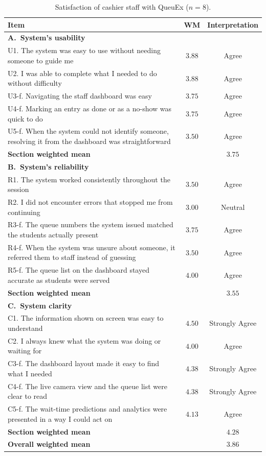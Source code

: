 \documentclass{research}
\newcommand{\sysname}{QueuEx}
\begin{document}
\begin{table}[!htbp]
\centering
\caption{Satisfaction of cashier staff with \sysname{} ($n = 8$).}
\label{tab:sop4-staff}
\begin{tabular}{p{}cc}
\hline
Item & WM & Interpretation \\
\hline
\multicolumn{3}{l}{\textbf{A.\ System's usability}} \\
U1. The system was easy to use without needing someone to guide me
  & $3.88$ & Agree \\
U2. I was able to complete what I needed to do without difficulty
  & $3.88$ & Agree \\
U3-f. Navigating the staff dashboard was easy
  & $3.75$ & Agree \\
U4-f. Marking an entry as done or as a no-show was quick to do
  & $3.75$ & Agree \\
U5-f. When the system could not identify someone, resolving it from the
  dashboard was straightforward & $3.50$ & Agree \\
\hline
\multicolumn{2}{l}{\textbf{Section weighted mean}} & $3.75$ \\
\hline
\multicolumn{3}{l}{\textbf{B.\ System's reliability}} \\
R1. The system worked consistently throughout the session
  & $3.50$ & Agree \\
R2. I did not encounter errors that stopped me from continuing
  & $3.00$ & Neutral \\
R3-f. The queue numbers the system issued matched the students actually
  present & $3.75$ & Agree \\
R4-f. When the system was unsure about someone, it referred them to
  staff instead of guessing & $3.50$ & Agree \\
R5-f. The queue list on the dashboard stayed accurate as students were
  served & $4.00$ & Agree \\
\hline
\multicolumn{2}{l}{\textbf{Section weighted mean}} & $3.55$ \\
\hline
\multicolumn{3}{l}{\textbf{C.\ System clarity}} \\
C1. The information shown on screen was easy to understand
  & $4.50$ & Strongly Agree \\
C2. I always knew what the system was doing or waiting for
  & $4.00$ & Agree \\
C3-f. The dashboard layout made it easy to find what I needed
  & $4.38$ & Strongly Agree \\
C4-f. The live camera view and the queue list were clear to read
  & $4.38$ & Strongly Agree \\
C5-f. The wait-time predictions and analytics were presented in a way I
  could act on & $4.13$ & Agree \\
\hline
\multicolumn{2}{l}{\textbf{Section weighted mean}} & $4.28$ \\
\hline
\multicolumn{2}{l}{\textbf{Overall weighted mean}} & $\mathbf{3.86}$ \\
\hline
\end{tabular}
\end{table}
\end{document}
